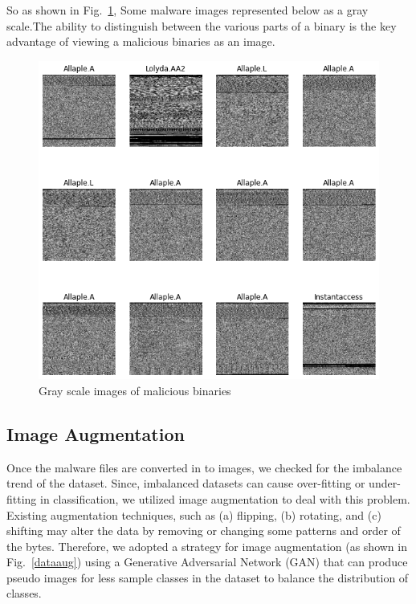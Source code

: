 \documentclass[pdflatex,sn-mathphys]{sn-jnl}%
\begin{document}
\par
So as shown in Fig.~\ref{grayscale}, Some malware images represented below as a gray scale.The ability to distinguish between the various parts of a binary is the key advantage of viewing a malicious binaries as an image.

\begin{figure}[h]
  \centering
 \includegraphics[width=1.0\textwidth]{grayscale.png}
  \caption{ Gray scale images of malicious binaries}
  \label{grayscale}
\end{figure}

\subsection{Image Augmentation}
\label{augmentation}
Once the malware files are converted in to images, we checked for the imbalance trend of the dataset. Since, imbalanced datasets can cause over-fitting or under-fitting in classification, we utilized image augmentation to deal with this problem. Existing augmentation techniques, such as (a) flipping, (b) rotating, and (c) shifting may alter the data by removing or changing some patterns and order of the bytes. Therefore, we adopted a strategy for image augmentation (as shown in Fig.~\ref{dataaug}) using a Generative Adversarial Network (GAN) that can produce pseudo images for less sample classes in the dataset to balance the distribution of classes.
\end{document}
